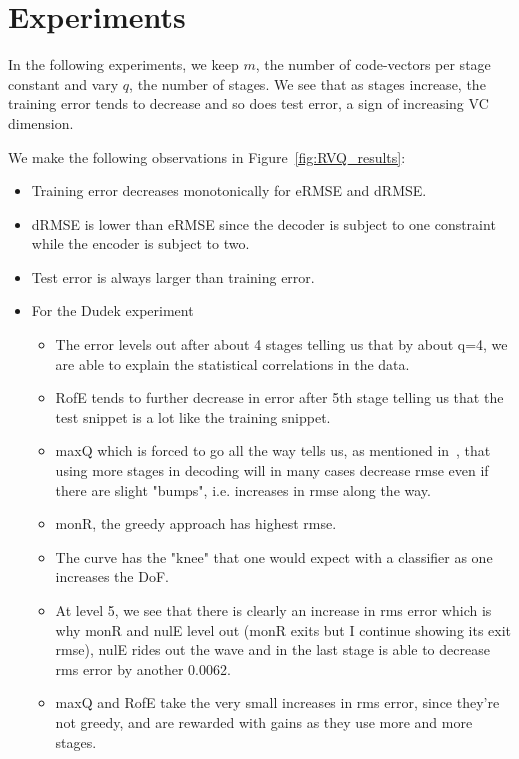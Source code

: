  


\section{Experiments}
In the following experiments, we keep $m$, the number of code-vectors per stage constant and vary $q$, the number of stages.  We see that as stages increase, the training error tends to decrease and so does test error, a sign of increasing VC dimension.

We make the following observations in Figure~\ref{fig:RVQ_results}:

\begin{itemize}
\item Training error decreases monotonically for eRMSE and dRMSE.
\item dRMSE is lower than eRMSE since the decoder is subject to one constraint while the encoder is subject to two.
\item Test error is always larger than training error.
\item For the Dudek experiment
\begin{itemize}
\item The error levels out after about 4 stages telling us that by about q=4, we are able to explain the statistical correlations in the data.  
\item RofE tends to further decrease in error after 5th stage telling us that the test snippet is a lot like the training snippet.  
\item maxQ which is forced to go all the way tells us, as mentioned in~\cite{1996_JNL_AdvancesRVQ_Barnes}, that using more stages in decoding will in many cases decrease rmse even if there are slight "bumps", i.e. increases in rmse along the way.  
\item monR, the greedy approach has highest rmse.
\item The curve has the "knee" that one would expect with a classifier as one increases the DoF.
\item At level 5, we see that there is clearly an increase in rms error which is why monR and nulE level out (monR exits but I continue showing its exit rmse), nulE rides out the wave and in the last stage is able to decrease rms error by another 0.0062.
\item maxQ and RofE take the very small increases in rms error, since they're not greedy, and are rewarded with gains as they use more and more stages.
\end{itemize}

\end{itemize}
